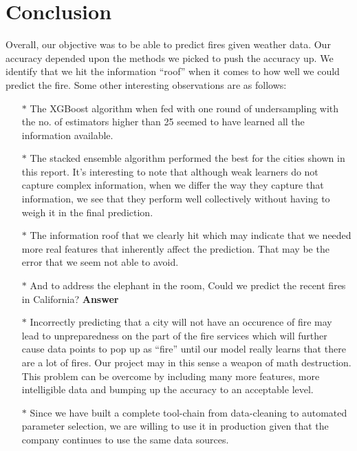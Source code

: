 \documentclass[10pt]{article}
\begin{document}
\section{Conclusion}
Overall, our objective was to be able to predict fires given weather data.
Our accuracy depended upon the methods we picked to push the accuracy up.
We identify that we hit the information ``roof'' when it comes to how well
we could predict the fire. Some other interesting observations are as
follows:\par
\begin{enumerate}
    \item[$\ast$]
    The XGBoost algorithm when fed with one round of undersampling with
    the no. of estimators higher than 25 seemed to have learned all the
    information available.
    \item[$\ast$]
    The stacked ensemble algorithm performed the best for the cities shown
    in this report. It's interesting to note that although weak learners
    do not capture complex information, when we differ the way they
    capture that information, we see that they perform well collectively
    without having to weigh it in the final prediction.
    \item[$\ast$]
    The information roof that we clearly hit which may indicate that we
    needed more real features that inherently affect the prediction. That
    may be the error that we seem not able to avoid.
    \item[$\ast$]
    And to address the elephant in the room, Could we predict the recent
    fires in California?
    \textbf{Answer}
    \item[$\ast$]
    Incorrectly predicting that a city will not have an occurence of
    fire may lead to unpreparedness on the part of the fire services
    which will further cause data points to pop up as ``fire'' until our
    model really learns that there are a lot of fires. Our project may
    in this sense a weapon of math destruction. This problem can be 
    overcome by including many more features, more intelligible data and
    bumping up the accuracy to an acceptable level.
    \item[$\ast$]
    Since we have built a complete tool-chain from data-cleaning to
    automated parameter selection, we are willing to use it in production
    given that the company continues to use the same data sources.
\end{enumerate}
\nocite{*}


\end{document}
